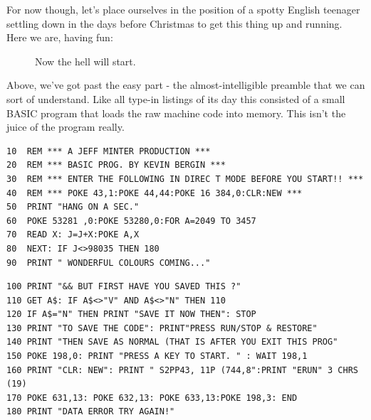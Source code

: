 For now though, let's place ourselves in the position of a spotty English teenager settling down in the days before Christmas to get
this thing up and running. Here we are, having fun: 

\begin{figure}[H]
    \centering
    \begin{adjustbox}{width=8cm,center}
    \end{adjustbox}
\caption*{Now the hell will start.}
\end{figure}

Above, we've got past the easy part - the almost-intelligible preamble that we can sort of understand.  Like all type-in listings of its day this consisted of a small BASIC program
that loads the raw machine code into memory. This isn't the juice of the program really.  

\lstset{style=C64BasicStyle}
\begin{lstlisting}[escapechar=\%]
10  REM *** A JEFF MINTER PRODUCTION ***
20  REM *** BASIC PROG. BY KEVIN BERGIN ***
30  REM *** ENTER THE FOLLOWING IN DIREC T MODE BEFORE YOU START!! ***
40  REM *** POKE 43,1:POKE 44,44:POKE 16 384,0:CLR:NEW ***
50  PRINT "HANG ON A SEC."
60  POKE 53281 ,0:POKE 53280,0:FOR A=2049 TO 3457
70  READ X: J=J+X:POKE A,X
80  NEXT: IF J<>98035 THEN 180
90  PRINT " WONDERFUL COLOURS COMING..."
\end{lstlisting}
\begin{lstlisting}[escapechar=\%]
100 PRINT "&& BUT FIRST HAVE YOU SAVED THIS ?"
110 GET A$: IF A$<>"V" AND A$<>"N" THEN 110
120 IF A$="N" THEN PRINT "SAVE IT NOW THEN": STOP
130 PRINT "TO SAVE THE CODE": PRINT"PRESS RUN/STOP & RESTORE"
140 PRINT "THEN SAVE AS NORMAL (THAT IS AFTER YOU EXIT THIS PROG"
150 POKE 198,0: PRINT "PRESS A KEY TO START. " : WAIT 198,1
160 PRINT "CLR: NEW": PRINT " S2PP43, 11P (744,8":PRINT "ERUN" 3 CHRS (19)
170 POKE 631,13: POKE 632,13: POKE 633,13:POKE 198,3: END
180 PRINT "DATA ERROR TRY AGAIN!"
\end{lstlisting}

